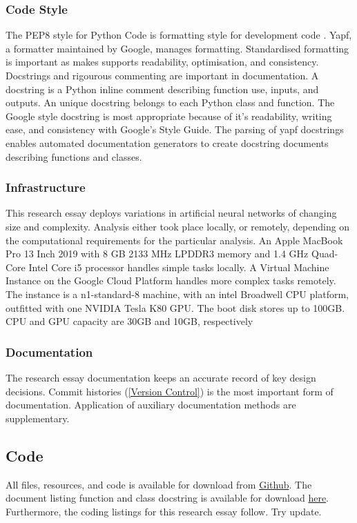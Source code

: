 \documentclass[12pt]{article}
\begin{document}
\subsubsection{Code Style} \label{CS}
The PEP8 style for Python Code is formatting style for development code \cite{PEP8}. 
Yapf, a formatter maintained by Google, manages formatting.
Standardised formatting is important as makes supports readability, optimisation, and consistency.
Docstrings and rigourous commenting are important in documentation. 
A docstring is a Python inline comment describing function use, inputs, and outputs.
An unique docstring belongs to each Python class and function. 
The Google style docstring is most appropriate because of it's readability, writing ease, and consistency with Google's Style Guide.
The parsing of yapf docstrings enables automated documentation generators to create docstring documents describing functions and classes.

\subsubsection{Infrastructure}
This research essay deploys variations in artificial neural networks of changing size and complexity.
Analysis either took place locally, or remotely, depending on the computational requirements for the particular analysis.
An Apple MacBook Pro 13 Inch 2019 with 8 GB 2133 MHz LPDDR3 memory and 1.4 GHz Quad-Core Intel Core i5 processor handles simple tasks locally.
A Virtual Machine Instance on the Google Cloud Platform handles more complex tasks remotely.
The instance is a n1-standard-8 machine, with an intel Broadwell CPU platform, outfitted with one NVIDIA Tesla K80 GPU.
The boot disk stores up to 100GB. CPU and GPU capacity are 30GB and 10GB, respectively

\subsubsection{Documentation}
The research essay documentation keeps an accurate record of key design decisions.
Commit histories (\ref{Version Control}) is the most important form of documentation.
Application of auxiliary documentation methods are supplementary.
\subsection{Code} \label{code}
All files, resources, and code is available for download from \href{https://github.com/CMCD1996/finance-honours}{Github}.
The document listing function and class docstring is available for download \href{/Users/connor/Google Drive/Documents/Professional/Projects/Portfolio/downloads/wip.pdf}{here}.
Furthermore, the coding listings for this research essay follow. Try update.
% 
\end{document}
